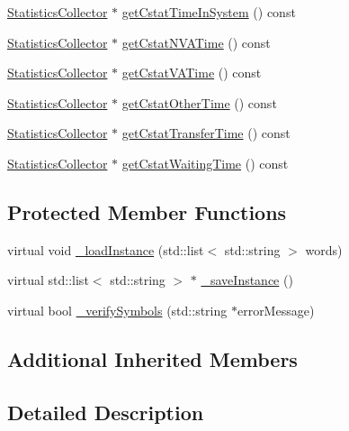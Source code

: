 \begin{DoxyCompactItemize}
\hyperlink{class_statistics_collector}{Statistics\-Collector} $\ast$ \hyperlink{class_entity_type_acdcb00168a8fc2e23cf8bf3302464ce3}{get\-Cstat\-Time\-In\-System} () const 
\item 
\hyperlink{class_statistics_collector}{Statistics\-Collector} $\ast$ \hyperlink{class_entity_type_a48e1dedd3e7d7b198ee4e7a61c6afb7e}{get\-Cstat\-N\-V\-A\-Time} () const 
\item 
\hyperlink{class_statistics_collector}{Statistics\-Collector} $\ast$ \hyperlink{class_entity_type_aafb65d3cdceae776da454989b7b4a874}{get\-Cstat\-V\-A\-Time} () const 
\item 
\hyperlink{class_statistics_collector}{Statistics\-Collector} $\ast$ \hyperlink{class_entity_type_a8b6a8b11d428c9e23800d01701e7fbd1}{get\-Cstat\-Other\-Time} () const 
\item 
\hyperlink{class_statistics_collector}{Statistics\-Collector} $\ast$ \hyperlink{class_entity_type_a2604288226dd7fc0c6c322d415b891cc}{get\-Cstat\-Transfer\-Time} () const 
\item 
\hyperlink{class_statistics_collector}{Statistics\-Collector} $\ast$ \hyperlink{class_entity_type_ae43feed54cd8661efb317ef4891bcfcf}{get\-Cstat\-Waiting\-Time} () const 
\end{DoxyCompactItemize}
\subsection*{Protected Member Functions}
\begin{DoxyCompactItemize}
\item 
virtual void \hyperlink{class_entity_type_af88c3d67f9eb8b92b4e32e04bed6730f}{\-\_\-load\-Instance} (std\-::list$<$ std\-::string $>$ words)
\item 
virtual std\-::list$<$ std\-::string $>$ $\ast$ \hyperlink{class_entity_type_a4f6179d5043e750d9555d6eeef8de4cd}{\-\_\-save\-Instance} ()
\item 
virtual bool \hyperlink{class_entity_type_a50e21c4807823132e777529c70bf7cef}{\-\_\-verify\-Symbols} (std\-::string $\ast$error\-Message)
\end{DoxyCompactItemize}
\subsection*{Additional Inherited Members}


\subsection{Detailed Description}



